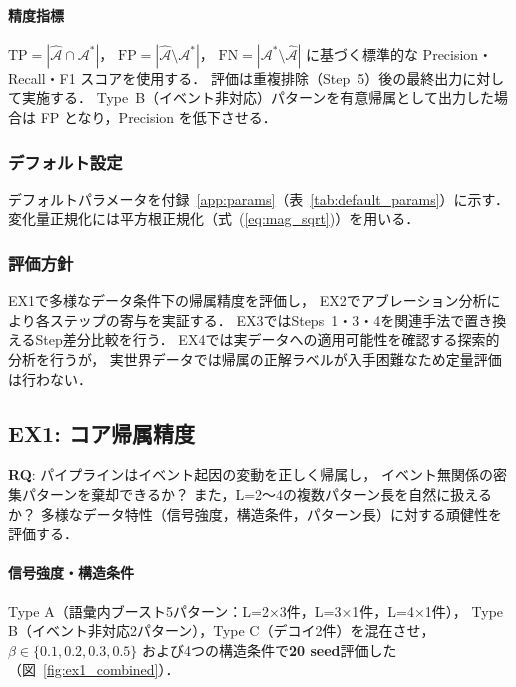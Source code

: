 \paragraph{精度指標}
$\text{TP} = |\hat{\mathcal{A}} \cap \mathcal{A}^*|$，
$\text{FP} = |\hat{\mathcal{A}} \setminus \mathcal{A}^*|$，
$\text{FN} = |\mathcal{A}^* \setminus \hat{\mathcal{A}}|$ に基づく標準的な Precision・Recall・F1 スコアを使用する．
評価は重複排除（Step~5）後の最終出力に対して実施する．
Type~B（イベント非対応）パターンを有意帰属として出力した場合は
FP となり，Precision を低下させる．

\subsubsection{デフォルト設定}

デフォルトパラメータを付録~\ref{app:params}（表~\ref{tab:default_params}）に示す．
変化量正規化には平方根正規化（式~(\ref{eq:mag_sqrt})）を用いる．

\subsubsection{評価方針}

EX1で多様なデータ条件下の帰属精度を評価し，
EX2でアブレーション分析により各ステップの寄与を実証する．
EX3ではSteps~1・3・4を関連手法で置き換えるStep差分比較を行う．
EX4では実データへの適用可能性を確認する探索的分析を行うが，
実世界データでは帰属の正解ラベルが入手困難なため定量評価は行わない．

\subsection{EX1: コア帰属精度}
\label{sec:exp_ex1}

\textbf{RQ}: パイプラインはイベント起因の変動を正しく帰属し，
イベント無関係の密集パターンを棄却できるか？
また，L=2〜4の複数パターン長を自然に扱えるか？
多様なデータ特性（信号強度，構造条件，パターン長）に対する頑健性を評価する．

\paragraph{信号強度・構造条件}
Type A（語彙内ブースト5パターン：L=2×3件，L=3×1件，L=4×1件），
Type B（イベント非対応2パターン），Type C（デコイ2件）を混在させ，
$\beta \in \{0.1, 0.2, 0.3, 0.5\}$ および4つの構造条件で\textbf{20 seed}評価した
（図~\ref{fig:ex1_combined}）．

